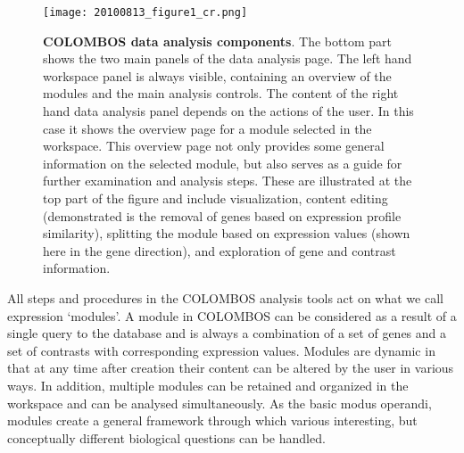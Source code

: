\begin{figure}
	\centering
  	\texttt{[image: 20100813\_figure1\_cr.png]}
  	\caption[COLOMBOS data analysis components]{\textbf{COLOMBOS data analysis 
  	components}. 
  	The bottom part shows the two main panels of the data analysis 
  	page. The left hand workspace panel is always visible, containing an 
  	overview of the modules and the main analysis controls. The content of the 
  	right hand data analysis panel depends on the actions of the user. In this 
  	case it shows the overview page for a module selected in the workspace. 
  	This overview page not only provides some general information on the 
  	selected module, but also serves as a guide for further examination and 
  	analysis steps. These are illustrated at the top part of the figure and 
  	include visualization, content editing (demonstrated is the removal of 
  	genes based on expression profile similarity), splitting the module based 
  	on expression values (shown here in the gene direction), and exploration of 
  	gene and contrast information.}
  	\label{fig:colombos-tools}
\end{figure}


All steps and procedures in the COLOMBOS analysis tools act on what we call 
expression `modules'. A module in COLOMBOS can be considered as a result of a 
single query to the database and is always a combination of a set of genes and 
a set of contrasts with corresponding expression values. Modules are dynamic in 
that at any time after creation their content can be altered by the user in 
various ways. In addition, multiple modules can be retained and organized in 
the workspace and can be analysed simultaneously. As the basic modus operandi, 
modules create a general framework through which various interesting, but 
conceptually different biological questions can be handled.

